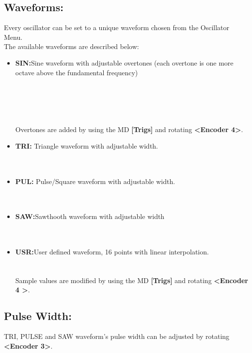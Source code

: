 \subsection{Waveforms:}
Every oscillator can be set to a unique waveform chosen from the Oscillator Menu.
\\
The available waveforms are described below:

\begin{itemize}
\item{\textbf{SIN:}}Sine waveform with adjustable overtones (each overtone is one more octave above the fundamental frequency)\\
\\\\
\\\\
\\Overtones are added by using the MD \textbf{[Trigs]} and rotating \textbf{<Encoder 4>}.
\item{\textbf{TRI:}} Triangle waveform with adjustable width.\\
\\\\
\item{\textbf{PUL:}} Pulse/Square waveform with adjustable width.\\
\\\\
\item{\textbf{SAW:}}Sawthooth waveform with adjustable width\\
\\\\
\item{\textbf{USR:}}User defined waveform, 16 points with linear interpolation.\\
\\\\
Sample values are modified by using the MD \textbf{[Trigs]} and rotating \textbf{<Encoder 4 >}.
\end{itemize}
\subsection{Pulse Width:}
TRI, PULSE and SAW waveform's pulse width can be adjusted by rotating \textbf{<Encoder 3>}.\\
\\
\newpage
